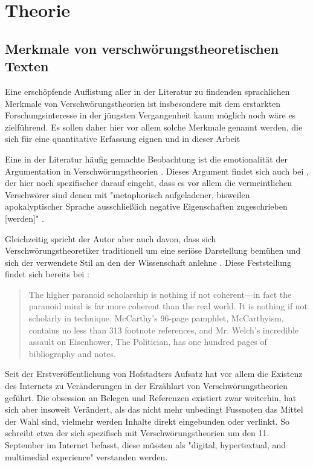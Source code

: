 \section{Theorie}


\subsection{Merkmale von verschwörungstheoretischen Texten}

Eine erschöpfende Auflistung aller in der Literatur zu findenden sprachlichen Merkmale von Verschwörungstheorien ist insbesondere mit dem erstarkten Forschungsinteresse in der jüngsten Vergangenheit kaum möglich noch wäre es zielführend.
Es sollen daher hier vor allem solche Merkmale genannt werden, die sich für eine quantitative Erfassung eignen und in dieser Arbeit 

Eine in der Literatur häufig gemachte Beobachtung ist die emotionalität der Argumentation in Verschwörungstheorien \parencite[Vgl.][10]{miller_2002}.
Dieses Argument findet sich auch bei \textcite[][93ff]{butter_2018}, der hier noch spezifischer darauf eingeht, dass es vor allem die vermeintlichen Verschwörer sind denen mit "metaphorisch aufgeladener, bisweilen apokalyptischer Sprache ausschließlich negative Eigenschaften zugeschrieben [werden]" \parencite[][93f]{butter_2018}.

Gleichzeitig spricht der Autor aber auch davon, dass sich Verschwörungstheoretiker traditionell um eine seriöse Darstellung bemühen und sich der verwendete Stil an den der Wissenschaft anlehne \parencite[][61]{butter_2018}.
Diese Feststellung findet sich bereits bei \textcite{hofstadter_2008}:

\begin{quotation}
    The higher paranoid scholarship is nothing if not coherent—in fact the paranoid mind is far more coherent than the real world. It is nothing if not scholarly in technique. McCarthy’s 96-page pamphlet, McCarthyism, contains no less than 313 footnote references, and Mr. Welch’s incredible assault on Eisenhower, The Politician, has one hundred pages of bibliography and notes. \parencite[][37]{hofstadter_2008}
\end{quotation}

Seit der Erstveröffentlichung von Hofstadters Aufsatz hat vor allem die Existenz des Internets zu Veränderungen in der Erzählart von Verschwörungstheorien geführt.
Die obsession an Belegen und Referenzen existiert zwar weiterhin, hat sich aber insoweit Verändert, als das nicht mehr unbedingt Fussnoten das Mittel der Wahl sind, vielmehr werden Inhalte direkt eingebunden oder verlinkt.
So schreibt etwa \textcite{soukup_2008} der sich spezifisch mit Verschwörungstheorien um den 11. September im Internet befasst, diese müssten als "digital, hypertextual, and multimedial experience" \parencite[10]{soukup_2008} verstanden werden.

